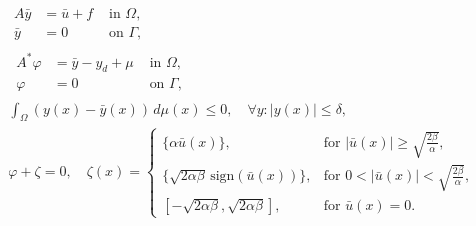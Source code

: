 \documentclass[11pt,a4paper]{amsart}
\newcommand{\om}{\Omega}
\newcommand{\ga}{\Gamma}
\begin{document}
\begin{subequations}\label{eq:optimal_system_P0}
	\begin{align}
&\begin{array}{rlc}
	A\bar y & = \bar u + f& \text{ in } \om, \\
      \bar y &= 0 & \text{ on } \ga, 
\end{array}\\
%
&\,\begin{array}{rlc}
	A^*\varphi & = \bar y -y_d + \mu& \text{ in } \om, \\
      \varphi &= 0 & \text{ on } \ga ,
\end{array} \label{eq:optimal_system_P0_b}\\
& \int_\om (y(x) - \bar y(x)) \, d\mu(x) \leq 0, \quad \forall y : |y(x)|\leq \delta, \label{eq:optimal_system_P0_c}\\
& \varphi  + \zeta =0, \quad 
\zeta(x) = 
\begin{cases} 
\{\alpha \bar u(x) \}, & \text{for } |\bar u(x)| \geq \sqrt{\frac{2\beta}{\alpha}}, \\
\{\sqrt{2 \alpha \beta} \, \text{sign}(\bar u(x))\}, & \text{for } 0<|\bar u(x)| < \sqrt{\frac{2\beta}{\alpha}}, \\
[-\sqrt{2 \alpha \beta},\sqrt{2 \alpha \beta}], & \text{for } \bar u(x)=0.
\end{cases} \label{eq:optimal_system_P0_d}
\end{align}
\end{subequations}
\end{document}
